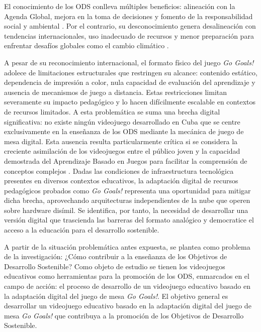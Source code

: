 El conocimiento de los ODS conlleva múltiples beneficios: alineación con la Agenda Global, mejora en la toma de decisiones y fomento de la responsabilidad social y ambiental \parencite{NacionesUnidas2023}. Por el contrario, su desconocimiento genera desalineación con tendencias internacionales, uso inadecuado de recursos y menor preparación para enfrentar desafíos globales como el cambio climático \parencite{NacionesUnidas2023}.

A pesar de su reconocimiento internacional, el formato físico del juego \textit{Go Goals!} adolece de limitaciones estructurales que restringen su alcance: contenido estático, dependencia de impresión a color, nula capacidad de evaluación del aprendizaje y ausencia de mecanismos de juego a distancia. Estas restricciones limitan severamente su impacto pedagógico y lo hacen difícilmente escalable en contextos de recursos limitados. A esta problemática se suma una brecha digital significativa: no existe ningún videojuego desarrollado en Cuba que se centre exclusivamente en la enseñanza de los ODS mediante la mecánica de juego de mesa digital. Esta ausencia resulta particularmente crítica si se considera la creciente asimilación de los videojuegos entre el público joven y la capacidad demostrada del Aprendizaje Basado en Juegos para facilitar la comprensión de conceptos complejos \parencite{Mabalay2025}. Dadas las condiciones de infraestructura tecnológica presentes en diversos contextos educativos, la adaptación digital de recursos pedagógicos probados como \textit{Go Goals!} representa una oportunidad para mitigar dicha brecha, aprovechando arquitecturas independientes de la nube que operen sobre hardware disímil. Se identifica, por tanto, la necesidad de desarrollar una versión digital que trascienda las barreras del formato analógico y democratice el acceso a la educación para el desarrollo sostenible.

A partir de la situación problemática antes expuesta, se plantea como problema de la investigación: ¿Cómo contribuir a la enseñanza de los Objetivos de Desarrollo Sostenible? Como objeto de estudio se tienen los videojuegos educativos como herramientas para la promoción de los ODS, enmarcados en el campo de acción: el proceso de desarrollo de un videojuego educativo basado en la adaptación digital del juego de mesa \textit{Go Goals!}. El objetivo general es desarrollar un videojuego educativo basado en la adaptación digital del juego de mesa \textit{Go Goals!} que contribuya a la promoción de los Objetivos de Desarrollo Sostenible.

